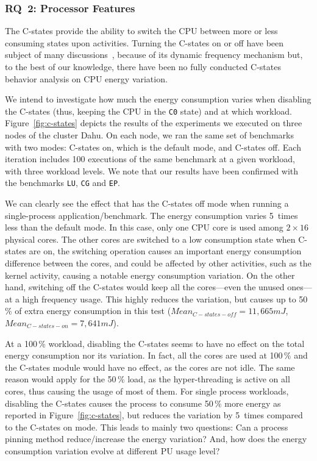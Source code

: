 \subsubsection{\textsc{RQ}~2: Processor Features}
The C-states provide the ability to switch the CPU between more or less consuming states upon activities.
Turning the C-states on or off have been subject of many discussions~\cite{5463056}, because of its dynamic frequency mechanism but, to the best of our knowledge, there have been no fully conducted C-states behavior analysis on CPU energy variation.

We intend to investigate how much the energy consumption varies when disabling the C-states (thus, keeping the CPU in the \texttt{C0} state) and at which workload.
Figure~\ref{fig:c-states} depicts the results of the experiments we executed on three nodes of the cluster \textsf{Dahu}.
On each node, we ran the same set of benchmarks with two modes: \textsf{C-states on}, which is the default mode, and \textsf{C-states off}.
Each iteration includes 100 executions of the same benchmark at a given workload, with three workload levels.
We note that our results have been confirmed with the benchmarks \texttt{LU}, \texttt{CG} and \texttt{EP}.

We can clearly see the effect that has the \textsf{C-states off} mode when running a single-process application/benchmark.
The energy consumption varies 5~times less than the default mode.
In this case, only one CPU core is used among $2\times16$ physical cores.
The other cores are switched to a low consumption state when C-states are on, the switching operation causes an important energy consumption difference between the cores, and could be affected by other activities, such as the kernel activity, causing a notable energy consumption variation.
On the other hand, switching off the C-states would keep all the cores---even the unused ones---at a high frequency usage.
This highly reduces the variation, but causes up to 50\,\% of extra energy consumption in this test ($Mean_{C-states-off}=11,665 mJ$,$Mean_{C-states-on}=7,641 mJ$).

At a 100\,\% workload, disabling the C-states seems to have no effect on the total energy consumption nor its variation.
In fact, all the cores are used at 100\,\% and the C-states module would have no effect, as the cores are not idle.
The same reason would apply for the 50\,\% load, as the hyper-threading is active on all cores, thus causing the usage of most of them.
For single process workloads, disabling the C-states causes the process to consume 50\,\% more energy as reported in Figure~\ref{fig:c-states}, but reduces the variation by 5~times compared to the \textsf{C-states on} mode.
This leads to mainly two questions: Can a process pinning method reduce/increase the energy variation? And, how does the energy consumption variation evolve at different PU usage level?

